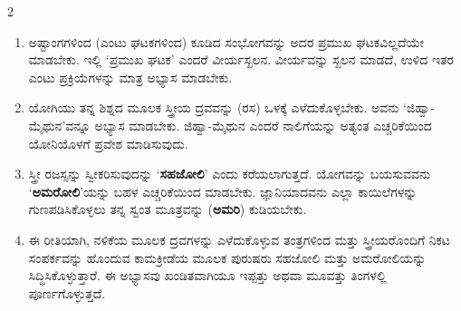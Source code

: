\begin{multicols}{2}
\begin{kan}
\begin{enumerate}[nosep]
\item[34.] ಅಷ್ಟಾಂಗಗಳಿಂದ (ಎಂಟು ಘಟಕಗಳಿಂದ) ಕೂಡಿದ ಸಂಭೋಗವನ್ನು ಅದರ ಪ್ರಮುಖ ಘಟಕವಿಲ್ಲದೆಯೇ ಮಾಡಬೇಕು. ಇಲ್ಲಿ ‘ಪ್ರಮುಖ ಘಟಕ’ ಎಂದರೆ ವೀರ್ಯಸ್ಖಲನ. ವೀರ್ಯವನ್ನು ಸ್ಖಲನ ಮಾಡದೆ, ಉಳಿದ ಇತರ ಎಂಟು ಪ್ರಕ್ರಿಯೆಗಳನ್ನು ಮಾತ್ರ ಅಭ್ಯಾಸ ಮಾಡಬೇಕು.
\item[35.] ಯೋಗಿಯು ತನ್ನ ಶಿಶ್ನದ ಮೂಲಕ ಸ್ತ್ರೀಯ ದ್ರವವನ್ನು (ರಸ) ಒಳಕ್ಕೆ ಎಳೆದುಕೊಳ್ಳಬೇಕು. ಅವನು ‘ಜಿಹ್ವಾ-ಮೈಥುನ’ವನ್ನೂ ಅಭ್ಯಾಸ ಮಾಡಬೇಕು. ಜಿಹ್ವಾ-ಮೈಥುನ ಎಂದರೆ ನಾಲಿಗೆಯನ್ನು ಅತ್ಯಂತ ಎಚ್ಚರಿಕೆಯಿಂದ ಯೋನಿಯೊಳಗೆ ಪ್ರವೇಶ ಮಾಡಿಸುವುದು.
\item[36.] ಸ್ತ್ರೀ ರಜಸ್ಸನ್ನು ಸ್ವೀಕರಿಸುವುದನ್ನು ‘\textbf{ಸಹಜೋಲಿ}’ ಎಂದು ಕರೆಯಲಾಗುತ್ತದೆ. ಯೋಗವನ್ನು ಬಯಸುವವನು ‘\textbf{ಅಮರೋಲಿ}’ಯನ್ನು ಬಹಳ ಎಚ್ಚರಿಕೆಯಿಂದ ಮಾಡಬೇಕು. ಜ್ಞಾನಿಯಾದವನು ಎಲ್ಲಾ ಕಾಯಿಲೆಗಳನ್ನು ಗುಣಪಡಿಸಿಕೊಳ್ಳಲು ತನ್ನ ಸ್ವಂತ ಮೂತ್ರವನ್ನು (\textbf{ಅಮರಿ}) ಕುಡಿಯಬೇಕು.
\item[37.] ಈ ರೀತಿಯಾಗಿ, ನಳಿಕೆಯ ಮೂಲಕ ದ್ರವಗಳನ್ನು ಎಳೆದುಕೊಳ್ಳುವ ತಂತ್ರಗಳಿಂದ ಮತ್ತು ಸ್ತ್ರೀಯರೊಂದಿಗೆ ನಿಕಟ ಸಂಪರ್ಕವನ್ನು ಹೊಂದುವ ಕಾಮಕ್ರೀಡೆಯ ಮೂಲಕ ಪುರುಷರು ಸಹಜೋಲಿ ಮತ್ತು ಅಮರೋಲಿಯನ್ನು ಸಿದ್ಧಿಸಿಕೊಳ್ಳುತ್ತಾರೆ. ಈ ಅಭ್ಯಾಸವು ಖಂಡಿತವಾಗಿಯೂ ಇಪ್ಪತ್ತು ಅಥವಾ ಮೂವತ್ತು ತಿಂಗಳಲ್ಲಿ ಪೂರ್ಣಗೊಳ್ಳುತ್ತದೆ.
\end{enumerate}
\end{kan}
\end{multicols}

\newpage

{}




\newpage

